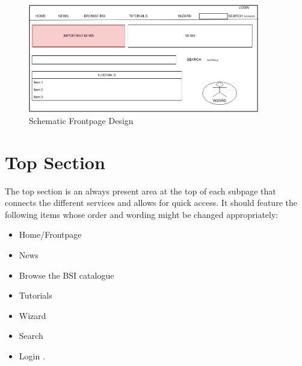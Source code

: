 \begin{figure}[h]
    \centering
    \includegraphics[width=0.9\textwidth]{Pictures/frontpage_mockup}
    \caption{Schematic Frontpage Design}
\end{figure}
 
\section{Top Section} 
\label{top_section}

The top section is an always present area at the top of each subpage that connects the different services and allows for quick access.
It should feature the following items whose order and wording might be changed appropriately:
\begin{itemize}
    \item Home/Frontpage
    \item News
    \item Browse the BSI catalogue
    \item Tutorials
    \item Wizard
    \item Search
    \item Login 
        . 
\end{itemize}



